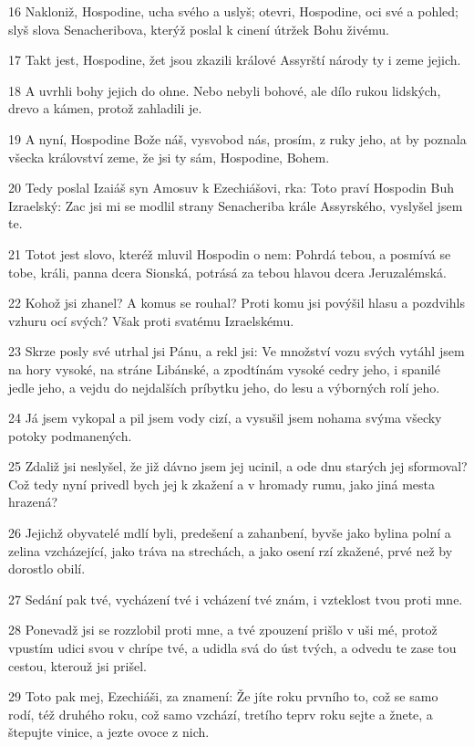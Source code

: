 \par 16 Nakloniž, Hospodine, ucha svého a uslyš; otevri, Hospodine, oci své a pohled; slyš slova Senacheribova, kterýž poslal k cinení útržek Bohu živému.
\par 17 Takt jest, Hospodine, žet jsou zkazili králové Assyrští národy ty i zeme jejich.
\par 18 A uvrhli bohy jejich do ohne. Nebo nebyli bohové, ale dílo rukou lidských, drevo a kámen, protož zahladili je.
\par 19 A nyní, Hospodine Bože náš, vysvobod nás, prosím, z ruky jeho, at by poznala všecka království zeme, že jsi ty sám, Hospodine, Bohem.
\par 20 Tedy poslal Izaiáš syn Amosuv k Ezechiášovi, rka: Toto praví Hospodin Buh Izraelský: Zac jsi mi se modlil strany Senacheriba krále Assyrského, vyslyšel jsem te.
\par 21 Totot jest slovo, kteréž mluvil Hospodin o nem: Pohrdá tebou, a posmívá se tobe, králi, panna dcera Sionská, potrásá za tebou hlavou dcera Jeruzalémská.
\par 22 Kohož jsi zhanel? A komus se rouhal? Proti komu jsi povýšil hlasu a pozdvihls vzhuru ocí svých? Však proti svatému Izraelskému.
\par 23 Skrze posly své utrhal jsi Pánu, a rekl jsi: Ve množství vozu svých vytáhl jsem na hory vysoké, na stráne Libánské, a zpodtínám vysoké cedry jeho, i spanilé jedle jeho, a vejdu do nejdalších príbytku jeho, do lesu a výborných rolí jeho.
\par 24 Já jsem vykopal a pil jsem vody cizí, a vysušil jsem nohama svýma všecky potoky podmanených.
\par 25 Zdaliž jsi neslyšel, že již dávno jsem jej ucinil, a ode dnu starých jej sformoval? Což tedy nyní privedl bych jej k zkažení a v hromady rumu, jako jiná mesta hrazená?
\par 26 Jejichž obyvatelé mdlí byli, predešení a zahanbení, byvše jako bylina polní a zelina vzcházející, jako tráva na strechách, a jako osení rzí zkažené, prvé než by dorostlo obilí.
\par 27 Sedání pak tvé, vycházení tvé i vcházení tvé znám, i vzteklost tvou proti mne.
\par 28 Ponevadž jsi se rozzlobil proti mne, a tvé zpouzení prišlo v uši mé, protož vpustím udici svou v chrípe tvé, a udidla svá do úst tvých, a odvedu te zase tou cestou, kterouž jsi prišel.
\par 29 Toto pak mej, Ezechiáši, za znamení: Že jíte roku prvního to, což se samo rodí, též druhého roku, což samo vzchází, tretího teprv roku sejte a žnete, a štepujte vinice, a jezte ovoce z nich.
